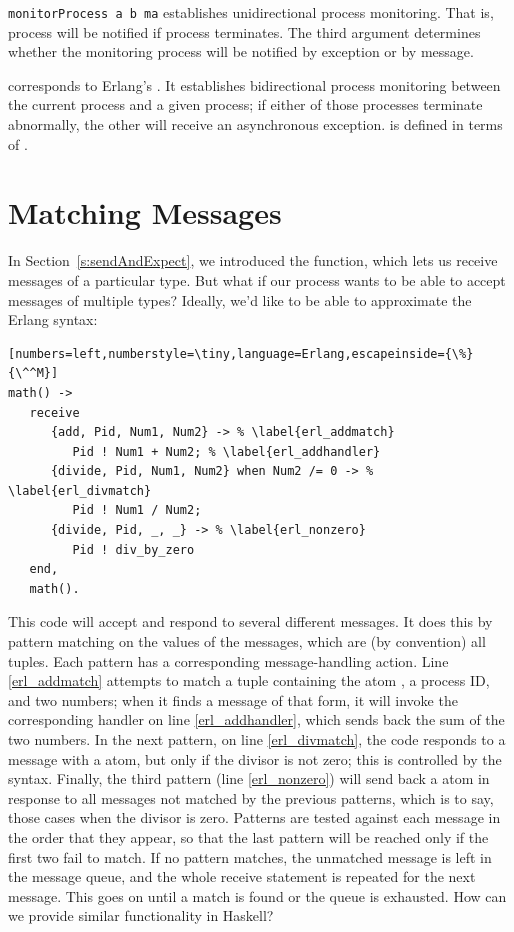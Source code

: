 \documentclass{sigplanconf}
\begin{document}
\noindent
\lstinline!monitorProcess a b ma! establishes unidirectional process monitoring. That is, process  will be notified if process  terminates. The third argument determines whether the monitoring process  will be notified by exception or by message.

 corresponds to Erlang's . It establishes bidirectional process monitoring between the current process and a given process; if either of those processes terminate abnormally, the other will receive an asynchronous exception.  is defined in terms of . 

\section{Matching Messages}
\label{s:matching}

In Section~\ref{s:sendAndExpect}, we introduced the  function, which lets us receive messages of a particular type. But what if our process wants to be able to accept messages of multiple types? Ideally, we'd like to be able to approximate the Erlang  syntax:
\needspace{10ex}
\begin{lstlisting}[numbers=left,numberstyle=\tiny,language=Erlang,escapeinside={\%}{\^^M}]
math() ->
   receive
      {add, Pid, Num1, Num2} -> % \label{erl_addmatch}
         Pid ! Num1 + Num2; % \label{erl_addhandler}
      {divide, Pid, Num1, Num2} when Num2 /= 0 -> % \label{erl_divmatch}
         Pid ! Num1 / Num2;
      {divide, Pid, _, _} -> % \label{erl_nonzero}
         Pid ! div_by_zero
   end,
   math().
\end{lstlisting}
\label{erl_math}

This code will accept and respond to several different messages. It does this by pattern matching on the values of the messages, which are (by convention) all tuples. Each pattern has a corresponding message-handling action. 
Line \ref{erl_addmatch} attempts to match a tuple containing the atom , a process ID, and two numbers; when it finds a message of that form, it will invoke the corresponding handler on line \ref{erl_addhandler}, which sends back the sum of the two numbers. 
In the next pattern, on line \ref{erl_divmatch}, the code responds to a message with a  atom, but only if the divisor is not zero; this is controlled by the  syntax. 
Finally, the third pattern (line \ref{erl_nonzero}) will send back a  atom in response to all messages not matched by the previous patterns, which is to say, those cases when the divisor is zero.
Patterns are tested against each message in the order that they appear, so that the last pattern will be reached only if the first two fail to match.
If no pattern matches, the unmatched message is left in the message queue, and the whole receive statement is repeated for the next message.  
This goes on until a match is found or the queue is exhausted.
How can we provide similar functionality in Haskell?
\end{document}
